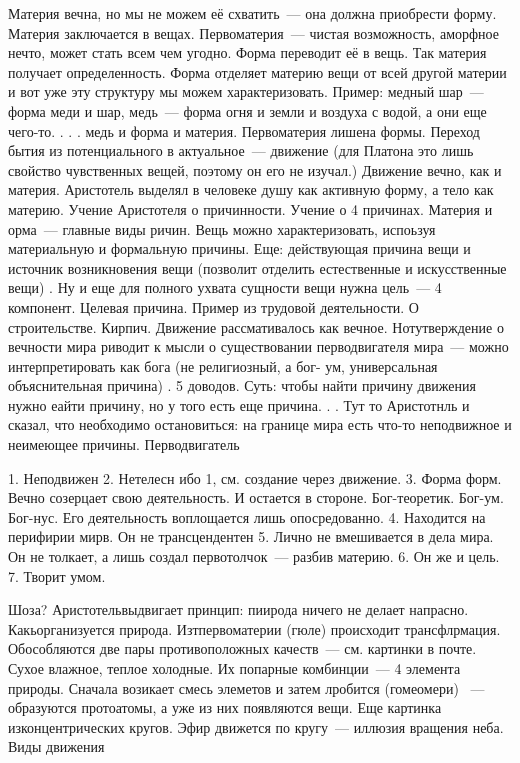 Материя вечна, но мы не можем её схватить~--- она должна приобрести форму. Материя заключается в вещах. Первоматерия~--- чистая возможность, аморфное нечто, может стать всем чем угодно. Форма переводит её в вещь. Так материя получает определенность. Форма отделяет материю вещи от всей другой материи и вот уже эту структуру мы можем характеризовать. Пример: медный шар~--- форма меди и шар, медь~--- форма огня и земли и воздуха с водой, а они еще чего-то. . . . медь и форма и материя. Первоматерия лишена формы. Переход бытия из потенциального в актуальное~--- движение (для Платона это лишь свойство чувственных вещей, поэтому он его не изучал.) Движение вечно, как и материя. 
Аристотель выделял в человеке душу как активную форму, а тело как материю. 
Учение Аристотеля о причинности. Учение о 4 причинах. Материя и орма~--- главные виды ричин. Вещь можно характеризовать, испоьзуя материальную и формальную причины. Еще: действующая причина вещи и источник возникновения вещи (позволит отделить естественные и искусственные вещи) . Ну и еще для полного ухвата сущности вещи нужна цель~--- 4 компонент. Целевая причина. 
Пример из трудовой деятельности. О строительстве. Кирпич. 
Движение рассмативалось как вечное. Нотутверждение о вечности мира риводит к мысли о существовании перводвигателя мира~--- можно интерпретировать как бога (не религиозный, а бог- ум, универсальная объяснительная причина) . 5 доводов. Суть: чтобы найти причину движения нужно еайти причину, но у того есть еще причина. . . Тут то Аристотнль и сказал, что необходимо остановиться: на границе мира есть что-то неподвижное и неимеющее причины. 
Перводвигатель

	1. Неподвижен
	2. Нетелесн ибо 1, см. создание через движение. 
	3. Форма форм. Вечно созерцает свою деятельность. И остается в стороне. Бог-теоретик. Бог-ум. Бог-нус. Его деятельность воплощается лишь опосредованно. 
	4. Находится на перифирии мирв. Он не трансцендентен
	5. Лично не вмешивается в дела мира. Он не толкает, а лишь создал первотолчок~--- разбив материю. 
	6. Он же и цель. 
	7. Творит умом. 

Шоза?
Аристотельвыдвигает принцип: пиирода ничего не делает напрасно. Какьорганизуется природа. Изтпервоматерии (гюле) происходит трансфлрмация. Обособляются две пары противоположных качеств~--- см. картинки в почте. Сухое влажное, теплое холодные. Их попарные комбинции~--- 4 элемента природы. Сначала возикает смесь элеметов и затем лробится (гомеомери) ~--- образуются протоатомы, а уже из них появляются вещи. 
Еще картинка изконцентрических кругов. Эфир движется по кругу~--- иллюзия вращения неба. 
Виды движения

